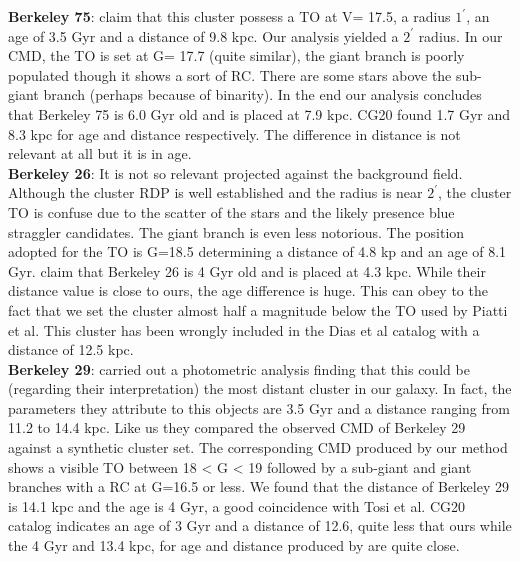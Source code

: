 \documentclass[draft]{aa}
\begin{document}
\textbf{Berkeley 75}: \cite{Carraro_2005} claim that this cluster possess
a TO at V= 17.5, a radius $1^{\prime}$, an age of 3.5 Gyr and a distance of
9.8 kpc. Our analysis yielded a $2^{\prime}$ radius. In our CMD, the TO
is set at G= 17.7 (quite similar), the giant branch is poorly populated
though it shows a sort of RC. There are some stars above the sub-giant branch
(perhaps because of binarity). In the end our analysis concludes that
Berkeley 75 is 6.0 Gyr old and is placed at 7.9 kpc. CG20 found 1.7 Gyr
and 8.3 kpc for age and distance respectively. The difference in distance
is not relevant at all but it is in age.\\

\textbf{Berkeley 26}: It is not so relevant projected against the background
field. Although the cluster RDP is well established and the radius is near
$2^{\prime}$, the cluster TO is confuse due to the scatter of the stars and the
likely presence blue straggler candidates. The giant branch is even less notorious.
The position adopted for the TO is G=18.5 determining a distance of 4.8 kp
and an age of 8.1 Gyr. \cite{Piatti_2010} claim that Berkeley 26 is 4 Gyr old
and is placed at 4.3 kpc. While their distance value is close to ours, the age
difference is huge. This can obey to the fact that we set the cluster almost
half a magnitude below the TO used by Piatti et al. This cluster has been
wrongly included in the Dias et al catalog with a distance of 12.5 kpc.\\

\textbf{Berkeley 29}: \cite{Tosi_2004} carried out a
photometric analysis finding that this could be (regarding their
interpretation) the most distant cluster in our galaxy. In fact, the
parameters they attribute to this objects are 3.5 Gyr and a distance ranging
from 11.2 to 14.4 kpc. Like us they compared the observed CMD of Berkeley 29
against a synthetic cluster set. The corresponding CMD produced by our method
shows a visible TO between 18 < G < 19 followed by a sub-giant and giant
branches with a RC at G=16.5 or less. We found that the distance of Berkeley
29 is 14.1 kpc and the age is 4 Gyr, a good
coincidence with Tosi et al. CG20 catalog indicates an age of 3 Gyr and a
distance of 12.6, quite less that ours while the 4 Gyr and 13.4 kpc, for
age and distance produced by \cite{Frinchaboy_2006} are quite close.\\ 
\end{document}
